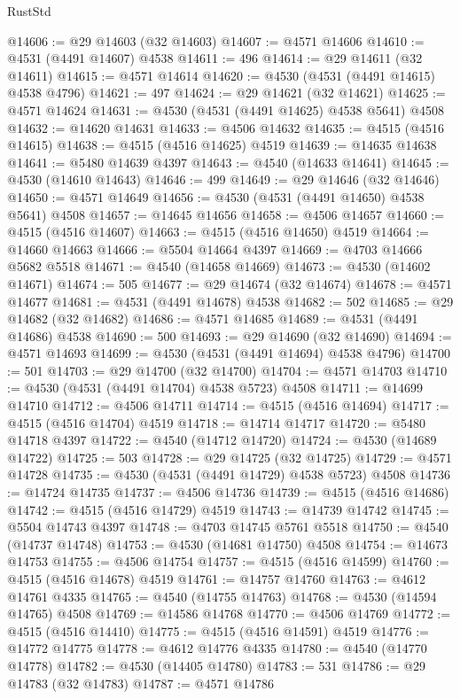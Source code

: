 \begin{lexlean}{RustStd}
\begin{coremodule}
@14606 := @29 @14603 (@32 @14603)
@14607 := @4571 @14606
@14610 := @4531 (@4491 @14607) @4538
@14611 := 496
@14614 := @29 @14611 (@32 @14611)
@14615 := @4571 @14614
@14620 := @4530 (@4531 (@4491 @14615) @4538 @4796)
@14621 := 497
@14624 := @29 @14621 (@32 @14621)
@14625 := @4571 @14624
@14631 := @4530 (@4531 (@4491 @14625) @4538 @5641) @4508
@14632 := @14620 @14631
@14633 := @4506 @14632
@14635 := @4515 (@4516 @14615)
@14638 := @4515 (@4516 @14625) @4519
@14639 := @14635 @14638
@14641 := @5480 @14639 @4397
@14643 := @4540 (@14633 @14641)
@14645 := @4530 (@14610 @14643)
@14646 := 499
@14649 := @29 @14646 (@32 @14646)
@14650 := @4571 @14649
@14656 := @4530 (@4531 (@4491 @14650) @4538 @5641) @4508
@14657 := @14645 @14656
@14658 := @4506 @14657
@14660 := @4515 (@4516 @14607)
@14663 := @4515 (@4516 @14650) @4519
@14664 := @14660 @14663
@14666 := @5504 @14664 @4397
@14669 := @4703 @14666 @5682 @5518
@14671 := @4540 (@14658 @14669)
@14673 := @4530 (@14602 @14671)
@14674 := 505
@14677 := @29 @14674 (@32 @14674)
@14678 := @4571 @14677
@14681 := @4531 (@4491 @14678) @4538
@14682 := 502
@14685 := @29 @14682 (@32 @14682)
@14686 := @4571 @14685
@14689 := @4531 (@4491 @14686) @4538
@14690 := 500
@14693 := @29 @14690 (@32 @14690)
@14694 := @4571 @14693
@14699 := @4530 (@4531 (@4491 @14694) @4538 @4796)
@14700 := 501
@14703 := @29 @14700 (@32 @14700)
@14704 := @4571 @14703
@14710 := @4530 (@4531 (@4491 @14704) @4538 @5723) @4508
@14711 := @14699 @14710
@14712 := @4506 @14711
@14714 := @4515 (@4516 @14694)
@14717 := @4515 (@4516 @14704) @4519
@14718 := @14714 @14717
@14720 := @5480 @14718 @4397
@14722 := @4540 (@14712 @14720)
@14724 := @4530 (@14689 @14722)
@14725 := 503
@14728 := @29 @14725 (@32 @14725)
@14729 := @4571 @14728
@14735 := @4530 (@4531 (@4491 @14729) @4538 @5723) @4508
@14736 := @14724 @14735
@14737 := @4506 @14736
@14739 := @4515 (@4516 @14686)
@14742 := @4515 (@4516 @14729) @4519
@14743 := @14739 @14742
@14745 := @5504 @14743 @4397
@14748 := @4703 @14745 @5761 @5518
@14750 := @4540 (@14737 @14748)
@14753 := @4530 (@14681 @14750) @4508
@14754 := @14673 @14753
@14755 := @4506 @14754
@14757 := @4515 (@4516 @14599)
@14760 := @4515 (@4516 @14678) @4519
@14761 := @14757 @14760
@14763 := @4612 @14761 @4335
@14765 := @4540 (@14755 @14763)
@14768 := @4530 (@14594 @14765) @4508
@14769 := @14586 @14768
@14770 := @4506 @14769
@14772 := @4515 (@4516 @14410)
@14775 := @4515 (@4516 @14591) @4519
@14776 := @14772 @14775
@14778 := @4612 @14776 @4335
@14780 := @4540 (@14770 @14778)
@14782 := @4530 (@14405 @14780)
@14783 := 531
@14786 := @29 @14783 (@32 @14783)
@14787 := @4571 @14786

\end{coremodule}
\end{lexlean}
